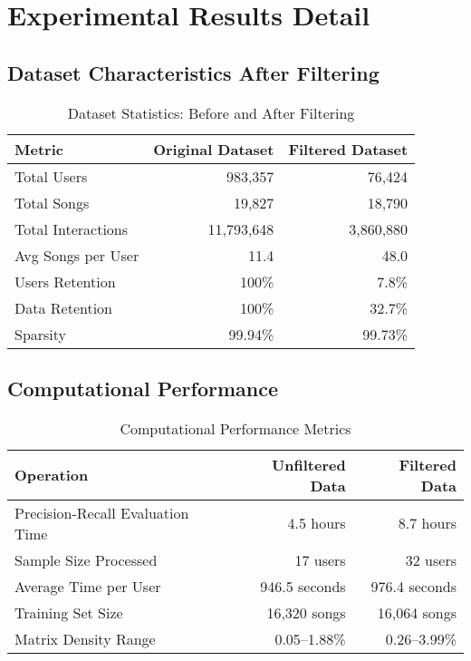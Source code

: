 \documentclass[12pt,a4paper]{article}
\begin{document}
\section{Experimental Results Detail}

\subsection{Dataset Characteristics After Filtering}

\begin{table}[H]
\centering
\caption{Dataset Statistics: Before and After Filtering}
\begin{tabular}{lrr}
\toprule
Metric & Original Dataset & Filtered Dataset \\
\midrule
Total Users & 983,357 & 76,424 \\
Total Songs & 19,827 & 18,790 \\
Total Interactions & 11,793,648 & 3,860,880 \\
Avg Songs per User & 11.4 & 48.0 \\
Users Retention & 100\% & 7.8\% \\
Data Retention & 100\% & 32.7\% \\
Sparsity & 99.94\% & 99.73\% \\
\bottomrule
\end{tabular}
\end{table}

\subsection{Computational Performance}

\begin{table}[H]
\centering
\caption{Computational Performance Metrics}
\begin{tabular}{lrr}
\toprule
Operation & Unfiltered Data & Filtered Data \\
\midrule
Precision-Recall Evaluation Time & 4.5 hours & 8.7 hours \\
Sample Size Processed & 17 users & 32 users \\
Average Time per User & 946.5 seconds & 976.4 seconds \\
Training Set Size & 16,320 songs & 16,064 songs \\
Matrix Density Range & 0.05--1.88\% & 0.26--3.99\% \\
\bottomrule
\end{tabular}
\end{table}
\end{document}

